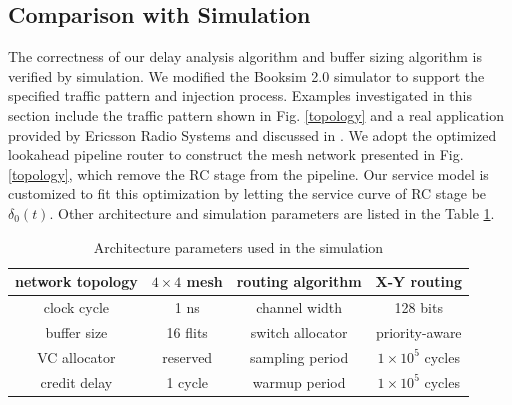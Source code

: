 \documentclass[10pt,journal]{IEEEtran}
\begin{document}
\subsection{Comparison with Simulation}\label{sim}
The correctness of our delay analysis algorithm and buffer sizing algorithm is verified by simulation. We modified the Booksim 2.0 simulator \cite{6557149} to support the specified traffic pattern and injection process. Examples investigated in this section include the traffic pattern shown in Fig. \ref{topology} and a real application provided by Ericsson Radio Systems and discussed in \cite{LuJa08}\cite{Jafari1922089}. We adopt the optimized lookahead pipeline router  \cite{jerger2009chip} to construct the mesh network presented in Fig. \ref{topology}, which remove the RC stage from the pipeline. Our service model is customized to fit this optimization by letting the service curve of RC stage be $\delta_0(t)$. Other architecture and simulation parameters are listed in the Table \ref{arcpara}.
\begin{table}[htbp]
\centering
\caption{\label{arcpara}Architecture parameters used in the simulation}
\begin{tabular}{|c|c||c|c|}
\hline
network topology    & $4\times 4$ mesh  &   routing algorithm & X-Y routing\\
\hline
clock cycle   & 1 ns &   channel width   & 128 bits\\
\hline
buffer size &   16 flits  &   switch allocator    &   priority-aware\\
\hline
VC allocator    &   reserved    & sampling period &   $1\times 10^5$ cycles\\
\hline
credit delay &  1 cycle   &  warmup period  & $1\times 10^5$ cycles \\
\hline
\end{tabular}
\end{table}
\end{document}
